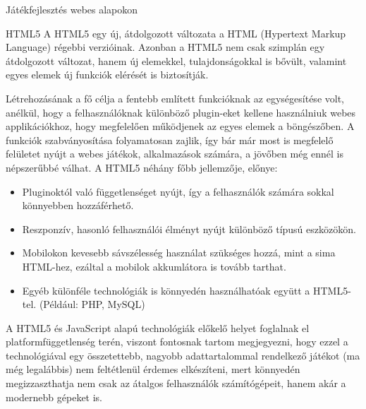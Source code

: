 \begin{MyChapter}{Játékfejlesztés webes alapokon}
	\begin{MySection}{HTML5}
		A HTML5 egy új, átdolgozott változata a HTML (Hypertext Markup Language) régebbi verzióinak.
		Azonban a HTML5 nem csak szimplán egy átdolgozott változat, hanem új elemekkel, tulajdonságokkal is bővült, valamint egyes elemek új funkciók elérését is biztosítják.
		
		Létrehozásának a fő célja a fentebb említett funkcióknak az egységesítése volt, anélkül, hogy a felhasználóknak különböző plugin-eket kellene használniuk webes applikációkhoz, hogy megfelelően működjenek az egyes elemek a böngészőben.
		A funkciók szabványosítása folyamatosan zajlik, így bár már most is megfelelő felületet nyújt a webes játékok, alkalmazások számára, a jövőben még ennél is népszerűbbé válhat.
		\newline \newline
		A HTML5 néhány főbb jellemzője, előnye:
		\begin{itemize}
			\item Pluginoktól való függetlenséget nyújt, így a felhasználók számára sokkal könnyebben hozzáférhető.
			\item Reszponzív, hasonló felhasználói élményt nyújt különböző típusú eszközökön.
			\item Mobilokon kevesebb sávszélesség használat szükséges hozzá, mint a sima HTML-hez, ezáltal a mobilok akkumlátora is tovább tarthat.
			\item Egyéb különféle technológiák is könnyedén használhatóak együtt a HTML5-tel. (Például: PHP, MySQL)
		\end{itemize}

		A HTML5 és JavaScript alapú technológiák előkelő helyet foglalnak el platformfüggetlenség terén, viszont fontosnak tartom megjegyezni, hogy ezzel a technológiával egy összetettebb, nagyobb adattartalommal rendelkező játékot (ma még legalábbis) nem feltétlenül érdemes elkészíteni, mert könnyedén megizzaszthatja nem csak az átalgos felhasználók számítógépeit, hanem akár a modernebb gépeket is.
	
	\end{MySection}


\end{MyChapter}
